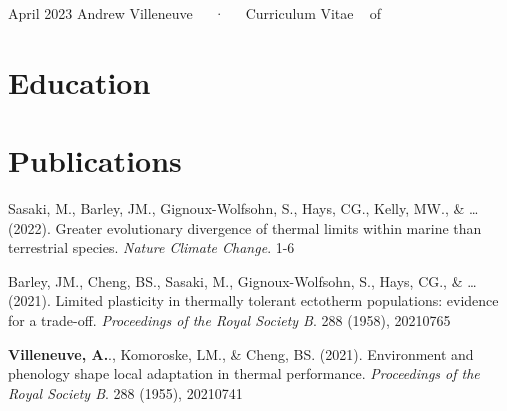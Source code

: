 \documentclass[11pt,a4paper,]{awesome-cv}
\begin{document}
\makecvheader

\makecvfooter
  {April 2023}
    {Andrew Villeneuve~~~·~~~Curriculum Vitae}
  {\thepage~ of \pageref{LastPage}~}





\hypertarget{education}{%
\section{Education}\label{education}}

\begin{cventries}
    \vspace{-4.0mm}
    \vspace{-4.0mm}
    \vspace{-4.0mm}
\end{cventries}

\hypertarget{publications}{%
\section{Publications}\label{publications}}

Sasaki, M., Barley, JM., Gignoux-Wolfsohn, S., Hays, CG., Kelly, MW., \&
\ldots{} (2022). Greater evolutionary divergence of thermal limits
within marine than terrestrial species. \emph{Nature Climate Change}.
1-6

Barley, JM., Cheng, BS., Sasaki, M., Gignoux-Wolfsohn, S., Hays, CG., \&
\ldots{} (2021). Limited plasticity in thermally tolerant ectotherm
populations: evidence for a trade-off. \emph{Proceedings of the Royal
Society B}. 288 (1958), 20210765

\textbf{Villeneuve, A.}., Komoroske, LM., \& Cheng, BS. (2021).
Environment and phenology shape local adaptation in thermal performance.
\emph{Proceedings of the Royal Society B}. 288 (1955), 20210741
\end{document}
